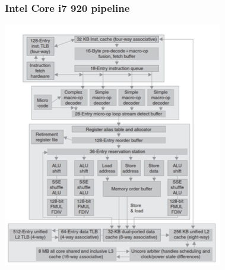 \documentclass[12pt,a4paper]{article}
\begin{document}
\subsubsection{Intel Core i7 920 pipeline}
\begin{center}
\includegraphics[width=0.6\columnwidth]{img/intel_pipeline.png}
\end{center}
\end{document}
